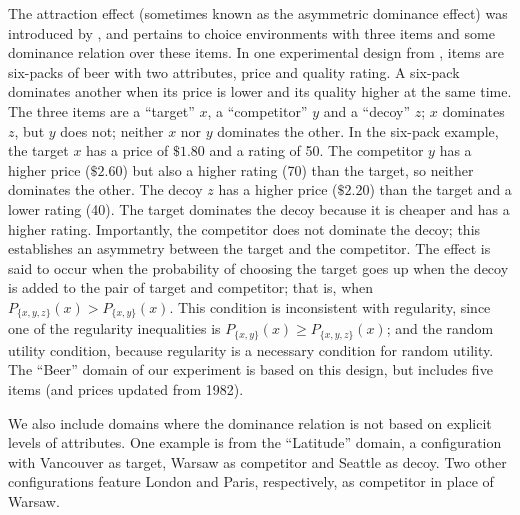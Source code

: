 \documentclass[11pt,letter]{article}
\newcommand{\bin}[2]{P_{\{#1,#2\}}(#1)}
\begin{document}
The attraction effect (sometimes known as the asymmetric dominance effect) was introduced by \citet{HubePaynPuto82}, and pertains to choice environments with three items and some dominance relation over these items.
In one experimental design from \citet{HubePaynPuto82}, items are six-packs of beer with two attributes, price and quality rating.
A six-pack dominates another when its price is lower and its quality higher at the same time.
The three items are a ``target'' $x$, a ``competitor'' $y$ and a ``decoy'' $z$; $x$ dominates $z$, but $y$ does not; neither $x$ nor $y$ dominates the other.
In the six-pack example, the target $x$ has a price of $\$1.80$ and a rating of 50.
The competitor $y$ has a higher price ($\$2.60$) but also a higher rating (70) than the target, so neither dominates the other.
The decoy $z$ has a higher price ($\$2.20$) than the target and a lower rating (40).
The target dominates the decoy because it is cheaper and has a higher rating.
Importantly, the competitor does not dominate the decoy; this establishes an asymmetry between the target and the competitor.
The effect is said to occur when the probability of choosing the target goes up when the decoy is added to the pair of target and competitor; that is, when $P_{\{x,y,z\}}(x) > \bin{x}{y}$.
This condition is inconsistent with regularity, since one of the regularity inequalities is $\bin{x}{y} \geq P_{\{x,y,z\}}(x)$; and the random utility condition, because regularity is a necessary condition for random utility.
The ``Beer'' domain of our experiment is based on this design, but includes five items (and prices updated from 1982).

We also include domains where the dominance relation is not based on explicit levels of attributes.
One example is from the ``Latitude'' domain, a configuration with Vancouver as target, Warsaw as competitor and Seattle as decoy.
Two other configurations feature London and Paris, respectively, as competitor in place of Warsaw.
\end{document}
